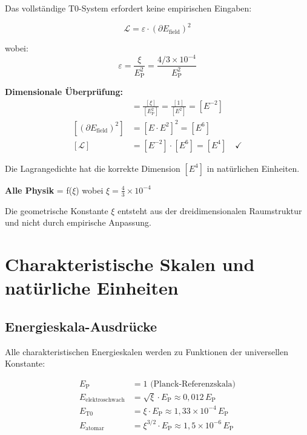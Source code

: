 \documentclass[12pt,a4paper]{report}
\newcommand{\EP}{E_{\text{P}}}            %
\begin{document}
	Das vollständige T0-System erfordert keine empirischen Eingaben:
	
	\begin{equation}
		\boxed{\mathcal{L} = \varepsilon \cdot (\partial E_{\text{field}})^2}
	\end{equation}
	
	wobei:
	\begin{equation}
		\varepsilon = \frac{\xi}{\EP^2} = \frac{4/3 \times 10^{-4}}{\EP^2}
	\end{equation}
	
	\textbf{Dimensionale Überprüfung:}
	\begin{align}
		[\varepsilon] &= \frac{[\xi]}{[\EP^2]} = \frac{[1]}{[E^2]} = [E^{-2}] \\
		[(\partial E_{\text{field}})^2] &= [E \cdot E^2]^2 = [E^6] \\
		[\mathcal{L}] &= [E^{-2}] \cdot [E^6] = [E^4] \quad \checkmark
	\end{align}
	
	Die Lagrangedichte hat die korrekte Dimension $[E^4]$ in natürlichen Einheiten.
	
	\begin{tcolorbox}[colback=green!5!white,colframe=green!75!black,title=Parameterfreie Physik]
		\textbf{Alle Physik} = f($\xi$) wobei $\xi = \frac{4}{3} \times 10^{-4}$
		
		Die geometrische Konstante $\xi$ entsteht aus der dreidimensionalen Raumstruktur und nicht durch empirische Anpassung.
	\end{tcolorbox}
	
	\section{Charakteristische Skalen und natürliche Einheiten}
	\label{sec:characteristic_scales}
	
	\subsection{Energieskala-Ausdrücke}
	\label{subsec:energy_scale_expressions}
	
	Alle charakteristischen Energieskalen werden zu Funktionen der universellen Konstante:
	
	\begin{align}
		\EP &= 1 \text{ (Planck-Referenzskala)} \\
		E_{\text{elektroschwach}} &= \sqrt{\xi} \cdot \EP \approx 0,012 \, \EP \\
		E_{\text{T0}} &= \xi \cdot \EP \approx 1,33 \times 10^{-4} \, \EP \\
		E_{\text{atomar}} &= \xi^{3/2} \cdot \EP \approx 1,5 \times 10^{-6} \, \EP
	\end{align}
	
\end{document}
